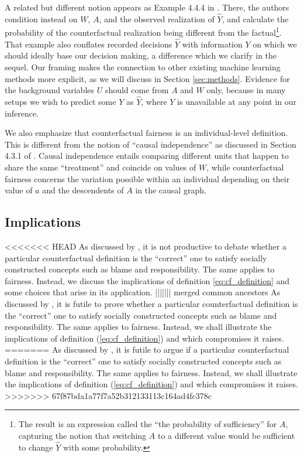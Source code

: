 A related but different notion appears as Example 4.4.4 in
\citet{pearl:16}. There, the authors condition instead on $W$, $A$,
and the observed realization of $\hat Y$, and calculate the
probability of the counterfactual realization being different from the
factual\footnote{The result is an expression called the ``the
  probability of sufficiency'' for $A$, capturing the notion that
  switching $A$ to a different value would be sufficient to change
  $\hat Y$ with some probability.}. That example also conflates
recorded decisions $\hat Y$ with information $Y$ on which we should ideally
base our decision making, a difference which we clarify in the
sequel.  Our framing makes the connection to other
existing machine learning methods more explicit, as we will discuss in
Section \ref{sec:methods}.  Evidence for the background variables $U$ should come from
$A$ and $W$ only, because in many setups we wish to predict some $Y$
as $\hat Y$, where   $Y$ is unavailable at any point
in our inference.

We also emphasize that counterfactual fairness is an individual-level
definition. This is different from the notion of ``causal independence''
as discussed in Section 4.3.1 of \cite{pearl:16}. Causal independence
entails comparing different units that happen to share the
same ``treatment'' and coincide on values of $W$, while
counterfactual fairness concerns the variation possible within an
individual depending on their value of $a$ and the descendents of
$A$ in the causal graph.

\subsection{Implications}
%
<<<<<<< HEAD
As discussed by \citet{halpern:16}, it is not productive to debate
whether a particular counterfactual definition is the ``correct'' one
to satisfy socially constructed concepts such as blame and responsibility.
The same applies to fairness. Instead, we discuss the
implications of definition \eqref{eq:cf_definition} and some choices
that arise in its application.
||||||| merged common ancestors
As discussed by \citet{halpern:16}, it is futile to prove whether a
particular counterfactual definition is the ``correct'' one to satisfy
socially constructed concepts such as blame and responsibility. The
same applies to fairness. Instead, we shall illustrate the
implications of definition (\ref{eq:cf_definition}) and which
compromises it raises.
=======
As discussed by \citet{halpern:16}, it is futile to argue if a
particular counterfactual definition is the ``correct'' one to satisfy
socially constructed concepts such as blame and responsibility. The
same applies to fairness. Instead, we shall illustrate the
implications of definition (\ref{eq:cf_definition}) and which
compromises it raises.
>>>>>>> 67f87bda1a77f7a52b312133113c164ad4fc378c

